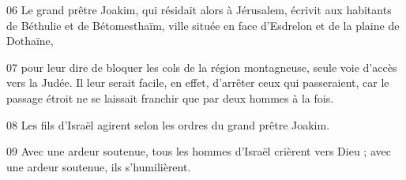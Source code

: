 

06 Le grand prêtre Joakim, qui résidait alors à Jérusalem, écrivit aux habitants de Béthulie et de Bétomesthaïm, ville située en face d'Esdrelon et de la plaine de Dothaïne,

07 pour leur dire de bloquer les cols de la région montagneuse, seule voie d'accès vers la Judée. Il leur serait facile, en effet, d'arrêter ceux qui passeraient, car le passage étroit ne se laissait franchir que par deux hommes à la fois.

08 Les fils d'Israël agirent selon les ordres du grand prêtre Joakim.

09 Avec une ardeur soutenue, tous les hommes d'Israël crièrent vers Dieu ; avec une ardeur soutenue, ils s'humilièrent.
